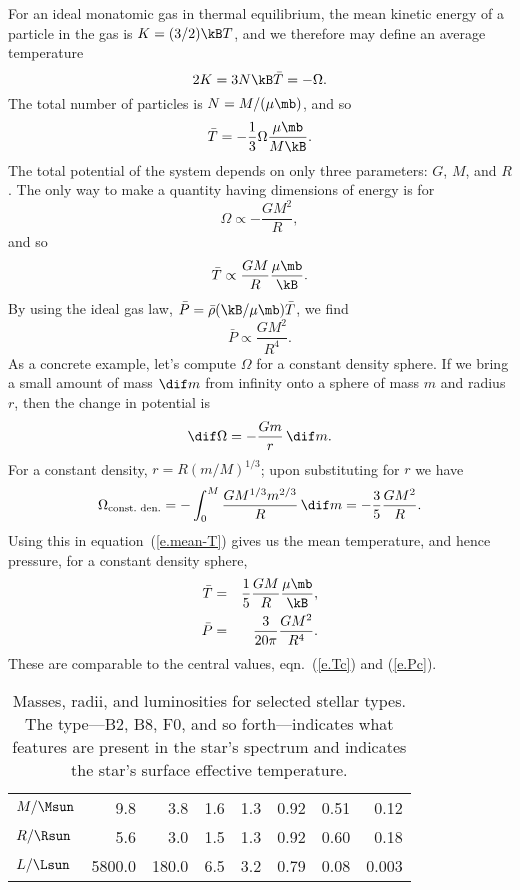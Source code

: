 For an ideal monatomic gas in thermal equilibrium, the mean kinetic energy of a particle in the gas is $K = (3/2)\kB T$, and we therefore may define an average temperature
\begin{equation}\label{e.Tbar}
	2 K = 3 N\kB \bar{T} = -\Omega.
\end{equation}
The total number of particles is $N=M/(\mu\mb)$, and so
\begin{equation}\label{e.mean-T}
\bar{T} = -\frac{1}{3}\Omega\frac{\mu\mb}{M\kB}.
\end{equation}
The total potential of the system depends on only three parameters: $G$, $M$, and $R$.  The only way to make a quantity having dimensions of energy is for
\[ \Omega \propto -\frac{GM^{2}}{R}, \]
and so
\[ \bar{T} \propto \frac{GM}{R}\frac{\mu\mb}{\kB}.  \]
By using the ideal gas law, $\bar{P} = \bar{\rho}(\kB/\mu\mb)\bar{T}$, we find
\[ \bar{P} \propto \frac{GM^{2}}{R^{4}}. \]
As a concrete example, let's compute $\Omega$ for a constant density sphere.
If we bring a small amount of mass $\dif m$ from infinity onto a sphere of mass $m$ and radius $r$, then the change in potential is \[ \dif\Omega = -\frac{Gm}{r}\,\dif m. \]
For a constant density, $r = R(m/M)^{1/3}$; upon substituting for $r$ we have
\begin{equation}\label{e.energy-constant-density-sphere}
	\Omega_{\textrm{const.\ den.}} = - \int_{0}^{M}\frac{GM^{1/3} m^{2/3}}{R}\,\dif m = -\frac{3}{5}\frac{GM^{2}}{R}.
\end{equation}
Using this in equation~(\ref{e.mean-T}) gives us the mean temperature, and hence pressure, for a constant density sphere,
\begin{eqnarray}\label{e.mean-T-rho}
\bar{T} &=& \frac{1}{5}\frac{GM}{R}\frac{\mu\mb}{\kB},\\
\label{e.mean-P}
\bar{P} &=& \frac{3}{20\pi}\frac{GM^{2}}{R^{4}}.
\end{eqnarray}
These are comparable to the central values, eqn.~(\ref{e.Tc}) and (\ref{e.Pc}).

\begin{table}
\caption[Masses, radii, and luminosities for selected stellar types]{\label{t.stellar-properties} Masses, radii, and luminosities for selected stellar types. The type---B2, B8, F0, and so forth---indicates what features are present in the star's spectrum and indicates the star's surface effective temperature.}
\begin{tabular}{ld{4.2}d{3.2}d{1.2}d{1.2}d{1.2}d{1.2}d{2.3}}
 &  &  &  &  &  &  & \\ 
\hline
$M/\Msun$ & 9.8 & 3.8 & 1.6 & 1.3 & 0.92 & 0.51 & 0.12\\
$R/\Rsun$ & 5.6 & 3.0 & 1.5 & 1.3 & 0.92 & 0.60 & 0.18\\
$L/\Lsun$ & 5800.0    & 180.0 & 6.5 & 3.2 & 0.79 & 0.08 & 0.003\\
\end{tabular}
\end{table}

